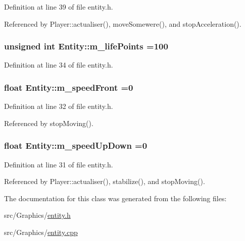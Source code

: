 Definition at line 39 of file entity.\-h.



Referenced by Player\-::actualiser(), move\-Somewere(), and stop\-Acceleration().

\hypertarget{class_entity_aeffb6deae5015518100f49b680a44fa0}{
\subsubsection[{m\-\_\-life\-Points}]{\setlength{\rightskip}{0pt plus 5cm}unsigned int Entity\-::m\-\_\-life\-Points =100\hspace{0.3cm}{\ttfamily [protected]}}}\label{class_entity_aeffb6deae5015518100f49b680a44fa0}


Definition at line 34 of file entity.\-h.

\hypertarget{class_entity_a6355c1ec7f08c88b955c7960b8e1ef60}{
\subsubsection[{m\-\_\-speed\-Front}]{\setlength{\rightskip}{0pt plus 5cm}float Entity\-::m\-\_\-speed\-Front =0\hspace{0.3cm}{\ttfamily [protected]}}}\label{class_entity_a6355c1ec7f08c88b955c7960b8e1ef60}


Definition at line 32 of file entity.\-h.



Referenced by stop\-Moving().

\hypertarget{class_entity_aee87de23c1e63a14dff1f2dd8597496d}{
\subsubsection[{m\-\_\-speed\-Up\-Down}]{\setlength{\rightskip}{0pt plus 5cm}float Entity\-::m\-\_\-speed\-Up\-Down =0\hspace{0.3cm}{\ttfamily [protected]}}}\label{class_entity_aee87de23c1e63a14dff1f2dd8597496d}


Definition at line 31 of file entity.\-h.



Referenced by Player\-::actualiser(), stabilize(), and stop\-Moving().



The documentation for this class was generated from the following files\-:\begin{DoxyCompactItemize}
\item 
src/\-Graphics/\hyperlink{entity_8h}{entity.\-h}\item 
src/\-Graphics/\hyperlink{entity_8cpp}{entity.\-cpp}\end{DoxyCompactItemize}
